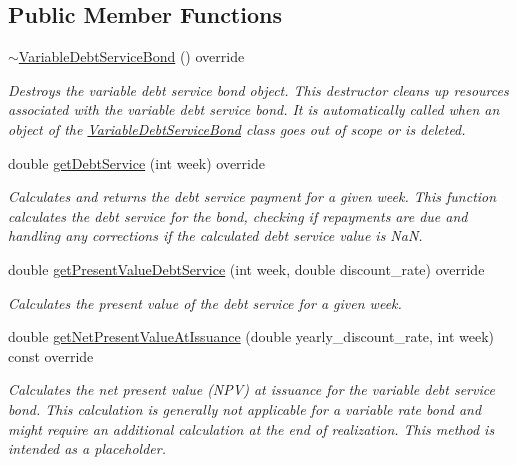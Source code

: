 \subsection*{Public Member Functions}
\begin{DoxyCompactItemize}
\item 
\mbox{\hyperlink{classVariableDebtServiceBond_a8259b64265dd9701ac5888e0fe0bc565}{$\sim$\+Variable\+Debt\+Service\+Bond}} () override
\begin{DoxyCompactList}\small\item\em Destroys the variable debt service bond object. This destructor cleans up resources associated with the variable debt service bond. It is automatically called when an object of the {\ttfamily \mbox{\hyperlink{classVariableDebtServiceBond}{Variable\+Debt\+Service\+Bond}}} class goes out of scope or is deleted. \end{DoxyCompactList}\item 
double \mbox{\hyperlink{classVariableDebtServiceBond_a575a9a41df38e005ba0a1cff3eb2b921}{get\+Debt\+Service}} (int week) override
\begin{DoxyCompactList}\small\item\em Calculates and returns the debt service payment for a given week. This function calculates the debt service for the bond, checking if repayments are due and handling any corrections if the calculated debt service value is NaN. \end{DoxyCompactList}\item 
double \mbox{\hyperlink{classVariableDebtServiceBond_aa5ad4fcc7c65154105388b332ae98198}{get\+Present\+Value\+Debt\+Service}} (int week, double discount\+\_\+rate) override
\begin{DoxyCompactList}\small\item\em Calculates the present value of the debt service for a given week. \end{DoxyCompactList}\item 
double \mbox{\hyperlink{classVariableDebtServiceBond_a8cc7ee442d788b91b8c00e6bed07644d}{get\+Net\+Present\+Value\+At\+Issuance}} (double yearly\+\_\+discount\+\_\+rate, int week) const override
\begin{DoxyCompactList}\small\item\em Calculates the net present value (N\+PV) at issuance for the variable debt service bond. This calculation is generally not applicable for a variable rate bond and might require an additional calculation at the end of realization. This method is intended as a placeholder. \end{DoxyCompactList}\item 

\end{DoxyCompactItemize}
